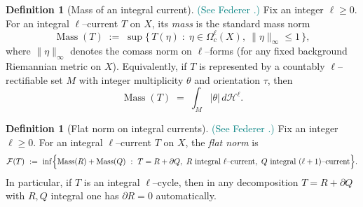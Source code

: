 \documentclass[11pt]{article}
\newcommand{\REVMZ}[1]{\textcolor{teal}{#1}}  %
\numberwithin{equation}{section}  %
\theoremstyle{plain}
\theoremstyle{definition}
\newtheorem{definition}[theorem]{Definition}
\theoremstyle{remark}
\DeclareMathOperator{\Mass}{Mass}
\begin{document}
\begin{definition}[Mass of an integral current]\label{def:mass}
\REVMZ{(See Federer \cite[4.1.7]{Fed69}.)}
Fix an integer $\ell\ge 0$.
For an integral $\ell$--current $T$ on $X$, its \emph{mass} is the standard mass norm
\[
\Mass(T)\;:=\;\sup\bigl\{\, T(\eta)\;:\;\eta\in\Omega_c^\ell(X),\ \|\eta\|_\infty\le 1 \,\bigr\},
\]
where $\|\eta\|_\infty$ denotes the comass norm on $\ell$--forms (for any fixed background Riemannian metric on $X$).
Equivalently, if $T$ is represented by a countably $\ell$--rectifiable set $M$ \REVMZ{\cite[4.1.28]{Fed69}}
with integer multiplicity $\theta$ and orientation $\tau$, then
\[
\Mass(T)\;=\;\int_M |\theta|\, d\mathcal{H}^\ell.
\]
\end{definition}


\begin{definition}[Flat norm on integral currents]\label{def:flat-norm}
\REVMZ{(See Federer \cite[4.1.12]{Fed69}.)}
Fix an integer $\ell\ge 0$.
For an integral $\ell$--current $T$ on $X$, the \emph{flat norm} is
\[
\mathcal{F}(T)\ :=\ \inf\Bigl\{\Mass(R)+\Mass(Q)\ :\ T=R+\partial Q,\ 
R\ \text{integral $\ell$--current},\ Q\ \text{integral $(\ell+1)$--current}\Bigr\}.
\]
In particular, if $T$ is an integral $\ell$--cycle, then in any decomposition $T=R+\partial Q$ with $R,Q$ integral
one has $\partial R=0$ automatically.
\end{definition}
\end{document}
